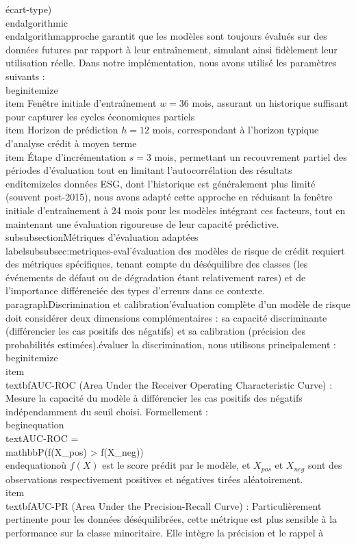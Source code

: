 écart-type)\n\\end{algorithmic}\n\\end{algorithm}\n\nCette approche garantit que les modèles sont toujours évalués sur des données futures par rapport à leur entraînement, simulant ainsi fidèlement leur utilisation réelle. Dans notre implémentation, nous avons utilisé les paramètres suivants :\n\n\\begin{itemize}\n    \\item Fenêtre initiale d'entraînement $w = 36$ mois, assurant un historique suffisant pour capturer les cycles économiques partiels\n    \\item Horizon de prédiction $h = 12$ mois, correspondant à l'horizon typique d'analyse crédit à moyen terme\n    \\item Étape d'incrémentation $s = 3$ mois, permettant un recouvrement partiel des périodes d'évaluation tout en limitant l'autocorrélation des résultats\n\\end{itemize}\n\nPour les données ESG, dont l'historique est généralement plus limité (souvent post-2015), nous avons adapté cette approche en réduisant la fenêtre initiale d'entraînement à 24 mois pour les modèles intégrant ces facteurs, tout en maintenant une évaluation rigoureuse de leur capacité prédictive.\n\n\\subsubsection{Métriques d'évaluation adaptées}\\label{subsubsec:metriques-eval}\n\nL'évaluation des modèles de risque de crédit requiert des métriques spécifiques, tenant compte du déséquilibre des classes (les événements de défaut ou de dégradation étant relativement rares) et de l'importance différenciée des types d'erreurs dans ce contexte.\n\n\\paragraph{Discrimination et calibration}\n\nL'évaluation complète d'un modèle de risque doit considérer deux dimensions complémentaires : sa capacité discriminante (différencier les cas positifs des négatifs) et sa calibration (précision des probabilités estimées).\n\nPour évaluer la discrimination, nous utilisons principalement :\n\n\\begin{itemize}\n    \\item \\textbf{AUC-ROC} (Area Under the Receiver Operating Characteristic Curve) : Mesure la capacité du modèle à différencier les cas positifs des négatifs indépendamment du seuil choisi. Formellement :\n    \n    \\begin{equation}\n    \\text{AUC-ROC} = \\mathbb{P}(f(X_{pos}) > f(X_{neg}))\n    \\end{equation}\n    \n    où $f(X)$ est le score prédit par le modèle, et $X_{pos}$ et $X_{neg}$ sont des observations respectivement positives et négatives tirées aléatoirement.\n    \n    \\item \\textbf{AUC-PR} (Area Under the Precision-Recall Curve) : Particulièrement pertinente pour les données déséquilibrées, cette métrique est plus sensible à la performance sur la classe minoritaire. Elle intègre la précision et le rappel à 